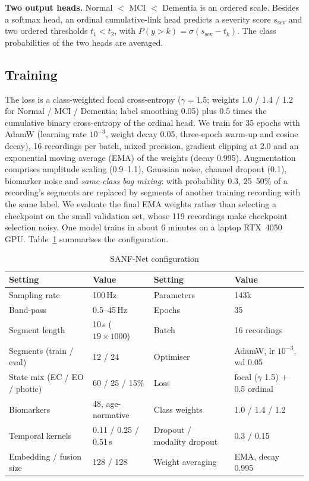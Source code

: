 \textbf{Two output heads.} Normal $<$ MCI $<$ Dementia is an ordered scale. Besides a softmax head, an ordinal
cumulative-link head \citep{mccullagh1980regression} predicts a severity score $s_{\mathrm{sev}}$ and two
ordered thresholds $t_1<t_2$, with $P(y>k)=\sigma(s_{\mathrm{sev}}-t_k)$. The class probabilities of the two
heads are averaged.

\subsection{Training}
The loss is a class-weighted focal cross-entropy \citep{lin2017focal} ($\gamma=1.5$; weights 1.0 / 1.4 / 1.2 for
Normal / MCI / Dementia; label smoothing 0.05) plus 0.5 times the cumulative binary cross-entropy of the
ordinal head. We train for 35 epochs with AdamW (learning rate $10^{-3}$, weight decay 0.05, three-epoch
warm-up and cosine decay), 16 recordings per batch, mixed precision, gradient clipping at 2.0 and an
exponential moving average (EMA) of the weights (decay 0.995). Augmentation comprises amplitude scaling
(0.9--1.1), Gaussian noise, channel dropout (0.1), biomarker noise and \emph{same-class bag mixing}: with
probability 0.3, 25--50\% of a recording's segments are replaced by segments of another training recording
with the same label. We evaluate the final EMA weights rather than selecting a checkpoint on the small
validation set, whose 119 recordings make checkpoint selection noisy. One model trains in about 6 minutes on
a laptop RTX~4050 GPU. Table~\ref{tab:hparams} summarises the configuration.

\begin{table}[H]
\centering
\caption{SANF-Net configuration}
\label{tab:hparams}
\small
\begin{tabular}{ll@{\hspace{2em}}ll}
\toprule
Setting & Value & Setting & Value\\
\midrule
Sampling rate & 100\,Hz & Parameters & 143k\\
Band-pass & 0.5--45\,Hz & Epochs & 35\\
Segment length & 10\,s ($19\times1000$) & Batch & 16 recordings\\
Segments (train / eval) & 12 / 24 & Optimiser & AdamW, lr $10^{-3}$, wd 0.05\\
State mix (EC / EO / photic) & 60 / 25 / 15\% & Loss & focal ($\gamma$ 1.5) + 0.5 ordinal\\
Biomarkers & 48, age-normative & Class weights & 1.0 / 1.4 / 1.2\\
Temporal kernels & 0.11 / 0.25 / 0.51\,s & Dropout / modality dropout & 0.3 / 0.15\\
Embedding / fusion size & 128 / 128 & Weight averaging & EMA, decay 0.995\\
\bottomrule
\end{tabular}
\end{table}
